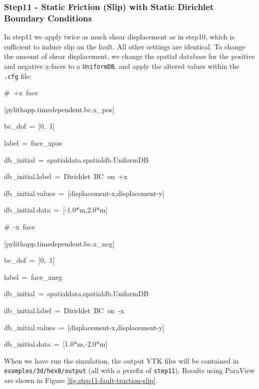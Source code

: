 \subsubsection{Step11 - Static Friction (Slip) with Static Dirichlet Boundary Conditions}

In step11 we apply twice as much shear displacement as in step10,
which is sufficient to induce slip on the fault. All other settings
are identical. To change the amount of shear displacement, we change
the spatial database for the positive and negative x-faces to a \texttt{UniformDB},
and apply the altered values within the \texttt{.cfg} file:
\begin{lyxcode}
\#~+x~face

{[}pylithapp.timedependent.bc.x\_pos{]}

bc\_dof~=~{[}0,~1{]}

label~=~face\_xpos

db\_initial~=~spatialdata.spatialdb.UniformDB

db\_initial.label~=~Dirichlet~BC~on~+x

db\_initial.values~=~{[}displacement-x,displacement-y{]}

db\_initial.data~=~{[}-1.0{*}m,2.0{*}m{]}



\#~-x~face

{[}pylithapp.timedependent.bc.x\_neg{]}

bc\_dof~=~{[}0,~1{]}

label~=~face\_xneg

db\_initial~=~spatialdata.spatialdb.UniformDB

db\_initial.label~=~Dirichlet~BC~on~-x

db\_initial.values~=~{[}displacement-x,displacement-y{]}

db\_initial.data~=~{[}1.0{*}m,-2.0{*}m{]}
\end{lyxcode}
When we have run the simulation, the output VTK files will be contained
in \texttt{examples/3d/hex8/output} (all with a pvrefix of \texttt{step11}).
Results using ParaView are shown in Figure \vref{fig:step11-fault-traction-slip}.


